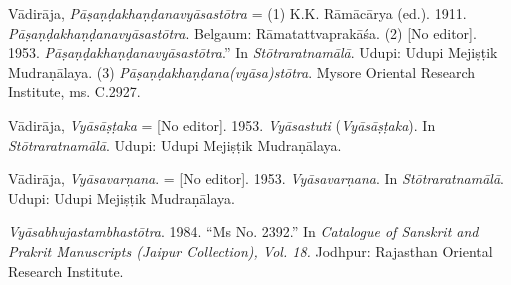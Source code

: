 \begin{hangparas}{0.125in}{1}
          \label{VP}Vādirāja, \emph{{Pāṣaṇḍakhaṇḍanavyāsastōtra}} = (1) K.\thinskip{}K. Rāmācārya (ed.). 1911. \emph{{Pāṣaṇḍakhaṇḍanavyāsastōtra}}. Belgaum: Rāmatattvaprakāśa. (2) [No editor]. 1953. \emph{{Pāṣaṇḍakhaṇḍanavyāsastōtra}}.” In \emph{{Stōtraratnamālā}}. Udupi: Udupi Mejiṣṭik Mudraṇālaya. (3) \emph{{Pā\-ṣaṇ\-ḍa\-khaṇ\-ḍa\-na\-(vyā\-sa)\-stō\-tra}}. Mysore Oriental Research Institute, ms. C.2927. 
	  \medskip


          \label{Vyasastaka}Vādirāja, \emph{{Vyāsāṣṭaka}} = [No editor]. 1953. \emph{{Vyāsastuti}} (\emph{{Vyāsāṣṭaka}}). In \emph{{Stōtraratnamālā}}. Udupi: Udupi Mejiṣṭik Mudraṇālaya.\medskip


          \label{Vyasavarnana}Vādirāja, \emph{{Vyāsavarṇana}}. = [No editor]. 1953. \emph{{Vyāsavarṇana}}. In \emph{{Stōtraratnamālā}}. Udupi: Udupi Mejiṣṭik Mudraṇālaya.\medskip


          \emph{{Vyāsabhujastambhastōtra}}. 1984. “Ms No. 2392.” In \emph{Catalogue of Sanskrit and Prakrit Manuscripts (Jaipur Collection), Vol. 18.} Jodhpur: Rajasthan Oriental Research Institute.\medskip


	
\end{hangparas}

